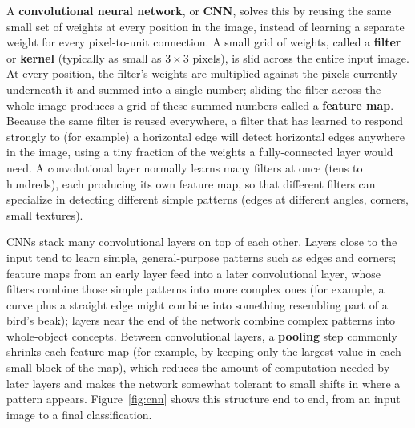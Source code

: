 \documentclass[11pt,a4paper]{report}
\begin{document}
A \textbf{convolutional neural network}, or \textbf{CNN}, solves this by
reusing the same small set of weights at every position in the image,
instead of learning a separate weight for every pixel-to-unit connection. A
small grid of weights, called a \textbf{filter} or \textbf{kernel} (typically
as small as $3\times3$ pixels), is slid across the entire input image. At
every position, the filter's weights are multiplied against the pixels
currently underneath it and summed into a single number; sliding the filter
across the whole image produces a grid of these summed numbers called a
\textbf{feature map}. Because the same filter is reused everywhere, a filter
that has learned to respond strongly to (for example) a horizontal edge will
detect horizontal edges anywhere in the image, using a tiny fraction of the
weights a fully-connected layer would need. A convolutional layer normally
learns many filters at once (tens to hundreds), each producing its own
feature map, so that different filters can specialize in detecting different
simple patterns (edges at different angles, corners, small textures).

CNNs stack many convolutional layers on top of each other. Layers close to
the input tend to learn simple, general-purpose patterns such as edges and
corners; feature maps from an early layer feed into a later convolutional
layer, whose filters combine those simple patterns into more complex ones
(for example, a curve plus a straight edge might combine into something
resembling part of a bird's beak); layers near the end of the network
combine complex patterns into whole-object concepts. Between convolutional
layers, a \textbf{pooling} step commonly shrinks each feature map (for
example, by keeping only the largest value in each small block of the map),
which reduces the amount of computation needed by later layers and makes the
network somewhat tolerant to small shifts in where a pattern appears.
Figure~\ref{fig:cnn} shows this structure end to end, from an input image to
a final classification.
\end{document}
